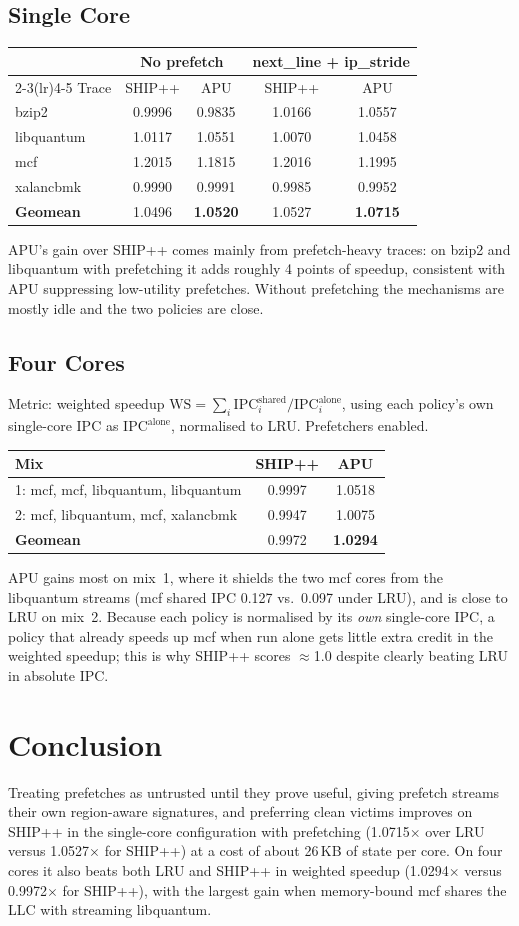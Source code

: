 \documentclass[11pt]{article}
\newcommand{\MixOneShip}{0.9997}\newcommand{\MixOneApu}{1.0518}
\newcommand{\MixTwoShip}{0.9947}\newcommand{\MixTwoApu}{1.0075}
\newcommand{\GmShip}{0.9972}\newcommand{\GmApu}{1.0294}
\newcommand{\FourCoreNote}{APU gains most on mix~1, where it
shields the two mcf cores from the libquantum streams (mcf shared IPC 0.127 vs.\ 0.097 under
LRU), and is close to LRU on mix~2.
Because each policy is normalised by its \emph{own} single-core IPC, a policy that already
speeds up mcf when run alone gets little extra credit in the weighted speedup; this is why
SHIP++ scores $\approx$1.0 despite clearly beating LRU in absolute IPC.}
\begin{document}
\subsection{Single Core}
\begin{center}
\begin{tabular}{lcccc}
  \toprule
  & \multicolumn{2}{c}{No prefetch} & \multicolumn{2}{c}{next\_line + ip\_stride} \\
  \cmidrule(lr){2-3}\cmidrule(lr){4-5}
  Trace & SHIP++ & APU & SHIP++ & APU \\
  \midrule
  bzip2      & 0.9996 & 0.9835 & 1.0166 & 1.0557 \\
  libquantum & 1.0117 & 1.0551 & 1.0070 & 1.0458 \\
  mcf        & 1.2015 & 1.1815 & 1.2016 & 1.1995 \\
  xalancbmk  & 0.9990 & 0.9991 & 0.9985 & 0.9952 \\
  \midrule
  \textbf{Geomean} & 1.0496 & \textbf{1.0520} & 1.0527 & \textbf{1.0715} \\
  \bottomrule
\end{tabular}
\end{center}
APU's gain over SHIP++ comes mainly from prefetch-heavy traces: on bzip2 and libquantum
with prefetching it adds roughly 4 points of speedup, consistent with APU suppressing
low-utility prefetches. Without prefetching the mechanisms are mostly idle and the two
policies are close.

\subsection{Four Cores}
Metric: weighted speedup
$\mathrm{WS} = \sum_i \mathrm{IPC}^{\text{shared}}_i / \mathrm{IPC}^{\text{alone}}_i$,
using each policy's own single-core IPC as $\mathrm{IPC}^{\text{alone}}$, normalised to
LRU. Prefetchers enabled.
\begin{center}
\begin{tabular}{lcc}
  \toprule
  Mix & SHIP++ & APU \\
  \midrule
  1: mcf, mcf, libquantum, libquantum & \MixOneShip & \MixOneApu \\
  2: mcf, libquantum, mcf, xalancbmk  & \MixTwoShip & \MixTwoApu \\
  \midrule
  \textbf{Geomean} & \GmShip & \textbf{\GmApu} \\
  \bottomrule
\end{tabular}
\end{center}
\FourCoreNote

\section{Conclusion}
Treating prefetches as untrusted until they prove useful, giving prefetch streams their
own region-aware signatures, and preferring clean victims improves on SHIP++ in the
single-core configuration with prefetching (1.0715$\times$ over LRU versus 1.0527$\times$
for SHIP++) at a cost of about 26\,KB of state per core. On four cores it also beats both LRU and
SHIP++ in weighted speedup (1.0294$\times$ versus
0.9972$\times$ for SHIP++), with the largest gain when memory-bound mcf shares the LLC with
streaming libquantum.
\end{document}
